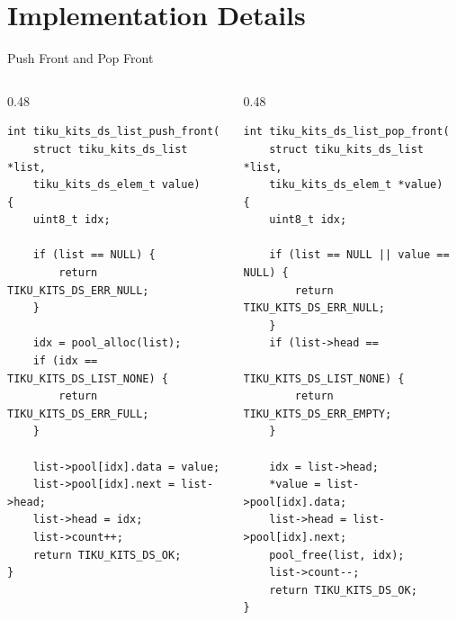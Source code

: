 \documentclass[aspectratio=169, 10pt]{beamer}
\begin{document}
\section{Implementation Details}

\begin{frame}[fragile]{Push Front and Pop Front}
\begin{columns}[T]
\begin{column}{0.48\textwidth}
\begin{lstlisting}[style=cstyle,
  title={push\_front --- $O(1)$}]
int tiku_kits_ds_list_push_front(
    struct tiku_kits_ds_list *list,
    tiku_kits_ds_elem_t value)
{
    uint8_t idx;

    if (list == NULL) {
        return TIKU_KITS_DS_ERR_NULL;
    }

    idx = pool_alloc(list);
    if (idx == TIKU_KITS_DS_LIST_NONE) {
        return TIKU_KITS_DS_ERR_FULL;
    }

    list->pool[idx].data = value;
    list->pool[idx].next = list->head;
    list->head = idx;
    list->count++;
    return TIKU_KITS_DS_OK;
}
\end{lstlisting}
\end{column}

\begin{column}{0.48\textwidth}
\begin{lstlisting}[style=cstyle,
  title={pop\_front --- $O(1)$}]
int tiku_kits_ds_list_pop_front(
    struct tiku_kits_ds_list *list,
    tiku_kits_ds_elem_t *value)
{
    uint8_t idx;

    if (list == NULL || value == NULL) {
        return TIKU_KITS_DS_ERR_NULL;
    }
    if (list->head ==
            TIKU_KITS_DS_LIST_NONE) {
        return TIKU_KITS_DS_ERR_EMPTY;
    }

    idx = list->head;
    *value = list->pool[idx].data;
    list->head = list->pool[idx].next;
    pool_free(list, idx);
    list->count--;
    return TIKU_KITS_DS_OK;
}
\end{lstlisting}
\end{column}
\end{columns}
\end{frame}
\end{document}
